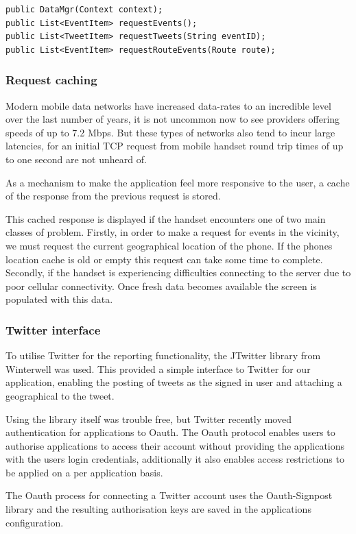 \begin{lstlisting}
public DataMgr(Context context);
public List<EventItem> requestEvents();
public List<TweetItem> requestTweets(String eventID);
public List<EventItem> requestRouteEvents(Route route);
\end{lstlisting}

\subsubsection{Request caching}
Modern mobile data networks have increased data-rates to an incredible level
over the last number of years, it is not uncommon now to see providers offering
speeds of up to 7.2 Mbps. But these types of networks also tend to incur large
latencies, for an initial TCP request from mobile handset round trip times of
up to one second are not unheard of.

As a mechanism to make the application feel more responsive to the user, a
cache of the response from the previous request is stored.

This cached response is displayed if the handset encounters one of two main
classes of problem. Firstly, in order to make a request for events in the
vicinity, we must request the current geographical location of the phone. If
the phones location cache is old or empty this request can take some time to
complete. Secondly, if the handset is experiencing difficulties connecting to
the server due to poor cellular connectivity. Once fresh data becomes available
the screen is populated with this data. 

\subsubsection{Twitter interface}
To utilise Twitter for the reporting functionality, the JTwitter library from
Winterwell was used. This provided a simple interface to Twitter for our
application, enabling the posting of tweets as the signed in user and attaching
a geographical to the tweet.

Using the library itself was trouble free, but Twitter recently moved
authentication for applications to Oauth. The Oauth protocol enables users to
authorise applications to access their account without providing the
applications with the users login credentials, additionally it also enables
access restrictions to be applied on a per application basis.

The Oauth process for connecting a Twitter account uses the Oauth-Signpost
library and the resulting authorisation keys are saved in the applications
configuration. 

